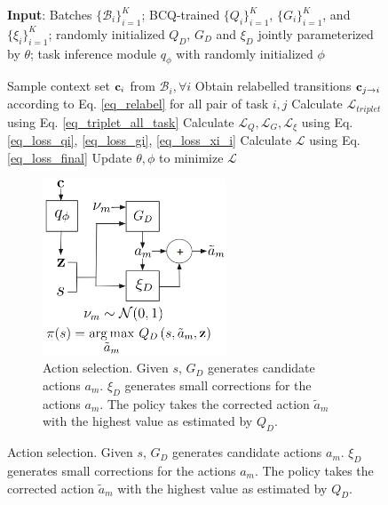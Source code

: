 \begin{figure}[!t]
    \begin{minipage}{0.5\textwidth}
        \begin{algorithm}[H]
            \caption{Distillation and triplet loss}\label{algo_mtbrl}
            {\bf Input}: Batches $\{\mathcal{B}_{i}\}_{i=1}^K$; BCQ-trained $\{Q_i\}^K_{i=1}$, $\{G_i\}^K_{i=1}$, and $\{\xi_i\}^K_{i=1}$; randomly initialized $Q_D$, $G_D$ and $\xi_D$ jointly parameterized by $\theta$; task inference module $q_\phi$ with randomly initialized $\phi$
            \begin{algorithmic}[1]
                \Repeat
                \State Sample context set ${\bf c}_i$ from $\mathcal{B}_{i}, \forall i$
                \State Obtain relabelled transitions ${\bf c}_{j\rightarrow i}$ according to Eq. \ref{eq_relabel} for all pair of task $i, j$
                \State Calculate $\mathcal{L}_{triplet}$ using Eq. \ref{eq_triplet_all_task}
                \State Calculate $\mathcal{L}_Q, \mathcal{L}_G, \mathcal{L}_\xi$ using Eq. \ref{eq_loss_qi}, \ref{eq_loss_gi}, \ref{eq_loss_xi_i}
                \State Calculate $\mathcal{L}$ using Eq. \ref{eq_loss_final}
                \State Update $\theta, \phi$ to minimize $\mathcal{L}$
            \end{algorithmic}
        \end{algorithm}
    \end{minipage}
    \hfill
    \begin{minipage}{0.45\textwidth}
        \begin{figure}[H]
            \centering
            \includegraphics[width=0.6\textwidth]{chapter_2/fig/action-selection.png}
            \caption{Action selection. Given $s$, $G_D$ generates candidate actions $a_m$.
                $\xi_D$ generates small corrections for the actions $a_m$. The policy takes the corrected action $\tilde{a}_m$ with the highest value as estimated by $Q_D$.}
            \label{fig:action}
        \end{figure}
    \end{minipage}
\end{figure}

